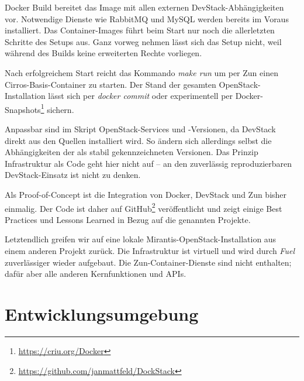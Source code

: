 Docker Build bereitet das Image mit allen externen DevStack-Abhängigkeiten vor. Notwendige Dienste wie RabbitMQ und MySQL werden bereits im Voraus installiert. Das Container-Images führt beim Start nur noch die allerletzten Schritte des Setups aus. Ganz vorweg nehmen lässt sich das Setup nicht, weil während des Builds keine erweiterten Rechte vorliegen.

Nach erfolgreichem Start reicht das Kommando \emph{make run} um per Zun einen Cirros-Basis-Container zu starten. Der Stand der gesamten OpenStack-Installation lässt sich per \emph{docker commit} oder experimentell per Docker-Snapshots\footnote{\url{https://criu.org/Docker}} sichern.

Anpassbar sind im Skript OpenStack-Services und -Versionen, da DevStack direkt aus den Quellen installiert wird. So ändern sich allerdings selbst die Abhängigkeiten der als stabil gekennzeichneten Versionen. Das Prinzip Infrastruktur als Code geht hier nicht auf -- an den zuverlässig reproduzierbaren DevStack-Einsatz ist nicht zu denken. 

Als Proof-of-Concept ist die Integration von Docker, DevStack und Zun bisher einmalig. Der Code ist daher auf GitHub\footnote{\url{https://github.com/janmattfeld/DockStack}} veröffentlicht und zeigt einige Best Practices und Lessons Learned in Bezug auf die genannten Projekte.

Letztendlich greifen wir auf eine lokale Mirantis-OpenStack-Installation aus einem anderen Projekt zurück. Die Infrastruktur ist virtuell und wird durch \emph{Fuel} zuverlässiger wieder aufgebaut. Die Zun-Container-Dienste sind nicht enthalten; dafür aber alle anderen Kernfunktionen und APIs.

\section{Entwicklungsumgebung}



